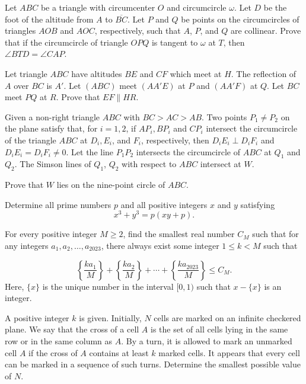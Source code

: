 \documentclass[11pt]{scrartcl}
\begin{document}
\begin{problem}[659871714637060308]
Let $ABC$ be a triangle with circumcenter $O$ and circumcircle $\omega$. Let $D$ be the foot of the altitude from $A$ to $\overline{BC}$. Let $P$ and $Q$ be points on the circumcircles of triangles $AOB$ and $AOC$, respectively, such that $A$, $P$, and $Q$ are collinear. Prove that if the circumcircle of triangle $OPQ$ is tangent to $\omega$ at $T$, then $\angle BTD=\angle CAP$.
\end{problem}
\begin{problem}[210358073900610]
Let triangle $ABC$ have altitudes $BE$ and $CF$ which meet at $H$. The reflection of $A$ over $BC$ is $A'$. Let $(ABC)$ meet $(AA'E)$ at $P$ and $(AA'F)$ at $Q$. Let $BC$ meet $PQ$ at $R$. Prove that $EF \parallel HR$.
\end{problem}
\begin{problem}[8895719454292056765]
Given a non-right triangle $ABC$ with $BC>AC>AB$. Two points $P_1 \neq P_2$ on the plane satisfy that, for $i=1,2$, if $AP_i, BP_i$ and $CP_i$ intersect the circumcircle of the triangle $ABC$ at $D_i, E_i$, and $F_i$, respectively, then $D_iE_i \perp D_iF_i$ and $D_iE_i = D_iF_i \neq 0$. Let the line $P_1P_2$ intersects the circumcircle of $ABC$ at $Q_1$ and $Q_2$. The Simson lines of $Q_1$, $Q_2$ with respect to $ABC$ intersect at $W$.

Prove that $W$ lies on the nine-point circle of $ABC$.
\end{problem}
\begin{problem}[25177681716771]
Determine all prime numbers $p$ and all positive integers $x$ and $y$ satisfying$$x^3+y^3=p(xy+p).$$
\end{problem}
\begin{problem}[3386683349955795885]
For every positive integer $M \geq  2$, find the smallest real number $C_M$ such that for any integers $a_1, a_2,\ldots , a_{2023}$, there always exist some integer $1 \leq k < M$ such that

\[\left\{\frac{ka_1}{M}\right\}+\left\{\frac{ka_2}{M}\right\}+\cdots+\left\{\frac{ka_{2023}}{M}\right\}\leq C_M.\]Here, $\{x\}$ is the unique number in the interval $[0, 1)$ such that $x - \{x\}$ is an integer.
\end{problem}
\begin{problem}[6183425212304704085]
	A positive integer $k$ is given. Initially, $N$ cells are marked on an infinite checkered plane. We say that the cross of a cell $A$ is the set of all cells lying in the same row or in the same column as $A$. By a turn, it is allowed to mark an unmarked cell $A$ if the cross of $A$ contains at least $k$ marked cells. It appears that every cell can be marked in a sequence of such turns. Determine the smallest possible value of $N$.
\end{problem}
\end{document}
